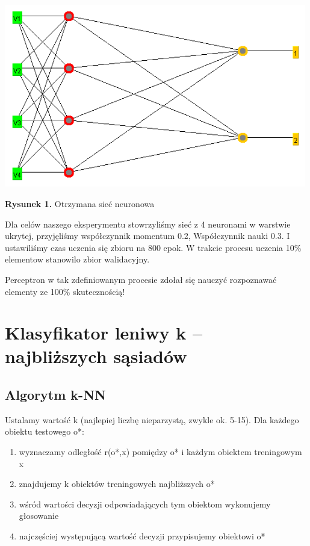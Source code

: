 \documentclass{classrep}
\begin{document}
\begin{center}
	\includegraphics[height=8cm]{siec.png}
	
	
	\textbf{Rysunek 1.} Otrzymana sieć neuronowa
\end{center}

Dla celów naszego eksperymentu stowrzyliśmy sieć z 4 neuronami w warstwie ukrytej, przyjęliśmy współczynnik momentum 0.2, Współczynnik nauki 0.3. I ustawiliśmy czas uczenia się zbioru na 800 epok. W trakcie procesu uczenia 10\% elementow stanowilo zbior walidacyjny.

Perceptron w tak zdefiniowanym procesie zdołał się nauczyć rozpoznawać elementy ze 100\% skutecznością!

\section{Klasyfikator leniwy k – najbliższych sąsiadów}
\subsection{Algorytm k-NN}
Ustalamy wartość k (najlepiej liczbę nieparzystą, zwykle ok. 5-15).
Dla każdego obiektu testowego o*:
\begin{enumerate}
\item wyznaczamy odległość r(o*,x) pomiędzy o* i każdym obiektem treningowym x
\item znajdujemy k obiektów treningowych najbliższych o*
\item wśród wartości decyzji odpowiadających tym obiektom wykonujemy głosowanie
\item najczęściej występującą wartość decyzji przypisujemy obiektowi o*
\end{enumerate}
\end{document}
